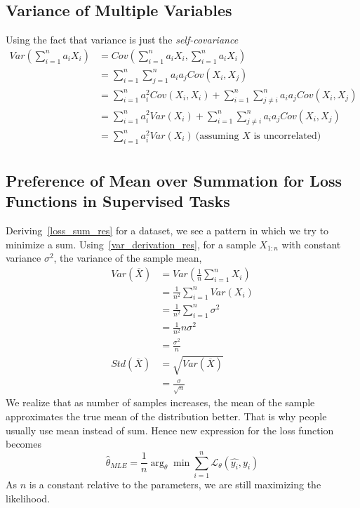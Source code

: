\documentclass{article}
\numberwithin{equation}{subsection}
\begin{document}
\subsection{Variance of Multiple Variables}
Using the fact that variance is just the \textit{self-covariance}
\begin{align}
    Var(\sum_{i=1}^{n} a_i X_i) &= Cov(\sum_{i=1}^{n} a_i X_i, \sum_{i=1}^{n} a_i X_i)\\
    &= \sum_{i=1}^{n} \sum_{j=1}^{n} a_i a_j Cov(X_i, X_j)\\
    &= \sum_{i=1}^{n} a_i^2 Cov(X_i, X_i) + \sum_{i=1}^{n} \sum_{j \neq i}^{n} a_i a_j Cov(X_i, X_j)\\
    &= \sum_{i=1}^{n} a_i^2 Var(X_i) + \sum_{i=1}^{n} \sum_{j \neq i}^{n} a_i a_j Cov(X_i, X_j)\\
    &= \sum_{i=1}^{n} a_i^2 Var(X_i)\ \text{(assuming $X$ is uncorrelated)}\label{var_derivation_res}\\
\end{align}
\subsection{Preference of Mean over Summation for Loss Functions in Supervised Tasks}
\label{mean_loss}
Deriving~\ref{loss_sum_res} for a dataset, we see a pattern in which we try to minimize a sum.
Using~\ref{var_derivation_res}, for a sample $X_{1:n}$ with constant variance $\sigma^2$, the variance of the sample mean,
\begin{align}
    Var(\overline{X}) &= Var(\frac{1}{n}\sum_{i=1}^{n} X_i)\\
    &= \frac{1}{n^2} \sum_{i=1}^{n} Var(X_i)\\
    &= \frac{1}{n^2} \sum_{i=1}^{n} \sigma^2\\
    &= \frac{1}{n^2} n \sigma^2\\
    &= \frac{\sigma^2}{n}\\
    Std(\overline{X}) &= \sqrt{Var(\overline{X})}\\
    &= \frac{\sigma}{\sqrt{n}}
\end{align}
We realize that as number of samples increases, the mean of the sample approximates the true mean of the distribution better. That is why people usually use mean instead of sum. Hence new expression for the loss function becomes 
\begin{equation}
    \hat{\theta}_{MLE} = \frac{1}{n}\arg_\theta \min \sum_{i=1}^n \mathcal{L}_\theta(\hat{y_i},y_i)
\end{equation}
As $n$ is a constant relative to the parameters, we are still maximizing the likelihood.
\end{document}
